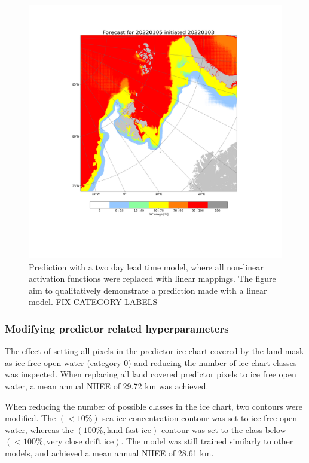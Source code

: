 \documentclass[../main/thesis]{subfiles}
\begin{document}
\begin{figure}
    \centering
    \includegraphics[width=\textwidth, trim=85mm 85mm 85mm 50mm, clip]{linear_model_jan}
    \caption{\label{fig:linear_model}Prediction with a two day lead time model, where all non-linear activation functions were replaced with linear mappings. The figure aim to qualitatively demonstrate a prediction made with a linear model. FIX CATEGORY LABELS}
\end{figure}

\subsubsection{Modifying predictor related hyperparameters}
The effect of setting all pixels in the predictor ice chart covered by the land mask as ice free open water (category 0) and reducing the number of ice chart classes was inspected. When replacing all land covered predictor pixels to ice free open water, a mean annual NIIEE of 29.72 km was achieved. 

When reducing the number of possible classes in the ice chart, two contours were modified. The $(< 10\%)$ sea ice concentration contour was set to ice free open water, whereas the $(100\%, \text{land fast ice})$ contour was set to the class below $(< 100\%, \text{very close drift ice})$. The model was still trained similarly to other models, and achieved a mean annual NIIEE of 28.61 km.  
\end{document}
